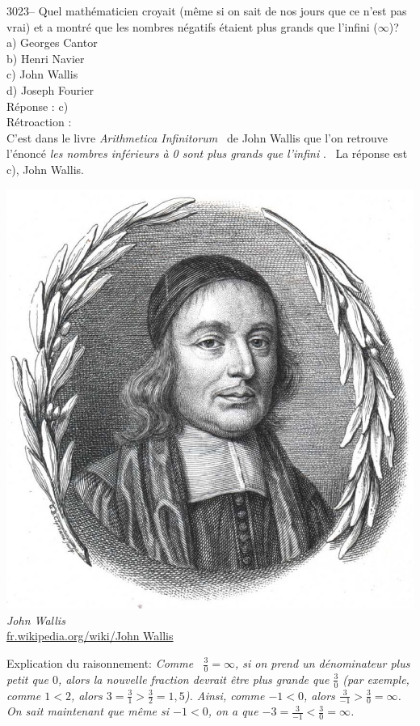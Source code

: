 \documentclass[letterpaper, 12pt]{article}
\begin{document}
3023-- Quel math\'ematicien croyait (m\^eme si on sait de nos jours que ce n'est pas vrai) et a montr\'e que les nombres n\'egatifs \'etaient plus grands que l'infini ($\infty$)?\\

a) Georges Cantor\\
b) Henri Navier\\
c) John Wallis\\
d) Joseph Fourier\\

R\'eponse : c)\\

R\'etroaction :\\
C'est dans le livre \og \emph{Arithmetica Infinitorum} \fg \ de John Wallis que l'on retrouve l'\'enonc\'e \og \emph{les nombres inf\'erieurs \`a 0 sont plus grands que l'infini} \fg. \ La r\'eponse est c), John Wallis.
\begin{center}
\includegraphics[scale=0.2]{John_Wallis.eps}\\
\emph{{\small John Wallis}}\\
\href{http://fr.wikipedia.org/wiki/John Wallis}{fr.wikipedia.org/wiki/John Wallis}
\end{center}

Explication du raisonnement: \emph{Comme \ $\frac{3}{0} = \infty$, si on prend un d\'enominateur plus petit que $0$, alors la nouvelle fraction devrait \^etre plus grande que $\frac{3}{0}$ (par exemple, comme $1 < 2$, alors $3 = \frac{3}{1} > \frac{3}{2} = 1,5$). Ainsi, comme $-1 < 0$, alors $\frac{3}{-1} > \frac{3}{0} = \infty$. On sait maintenant que m\^eme si $-1 < 0$, on a que $-3 = \frac{3}{-1} < \frac{3}{0} = \infty$.}\\
\end{document}
